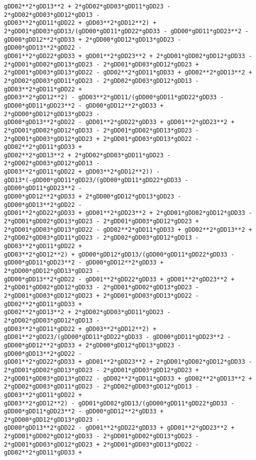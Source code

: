 \documentclass[landscape,letterpaper,10pt,english]{article}
\begin{document}
\begin{Verbatim}[commandchars=\\\{\}]
gDD02**2*gDD13**2 + 2*gDD02*gDD03*gDD11*gDD23 - 2*gDD02*gDD03*gDD12*gDD13 -
gDD03**2*gDD11*gDD22 + gDD03**2*gDD12**2) +
2*gDD01*gDD03*gDD13/(gDD00*gDD11*gDD22*gDD33 - gDD00*gDD11*gDD23**2 -
gDD00*gDD12**2*gDD33 + 2*gDD00*gDD12*gDD13*gDD23 - gDD00*gDD13**2*gDD22 -
gDD01**2*gDD22*gDD33 + gDD01**2*gDD23**2 + 2*gDD01*gDD02*gDD12*gDD33 -
2*gDD01*gDD02*gDD13*gDD23 - 2*gDD01*gDD03*gDD12*gDD23 +
2*gDD01*gDD03*gDD13*gDD22 - gDD02**2*gDD11*gDD33 + gDD02**2*gDD13**2 +
2*gDD02*gDD03*gDD11*gDD23 - 2*gDD02*gDD03*gDD12*gDD13 - gDD03**2*gDD11*gDD22 +
gDD03**2*gDD12**2) - gDD03**2*gDD11/(gDD00*gDD11*gDD22*gDD33 -
gDD00*gDD11*gDD23**2 - gDD00*gDD12**2*gDD33 + 2*gDD00*gDD12*gDD13*gDD23 -
gDD00*gDD13**2*gDD22 - gDD01**2*gDD22*gDD33 + gDD01**2*gDD23**2 +
2*gDD01*gDD02*gDD12*gDD33 - 2*gDD01*gDD02*gDD13*gDD23 -
2*gDD01*gDD03*gDD12*gDD23 + 2*gDD01*gDD03*gDD13*gDD22 - gDD02**2*gDD11*gDD33 +
gDD02**2*gDD13**2 + 2*gDD02*gDD03*gDD11*gDD23 - 2*gDD02*gDD03*gDD12*gDD13 -
gDD03**2*gDD11*gDD22 + gDD03**2*gDD12**2)) -
gDD13*(-gDD00*gDD11*gDD23/(gDD00*gDD11*gDD22*gDD33 - gDD00*gDD11*gDD23**2 -
gDD00*gDD12**2*gDD33 + 2*gDD00*gDD12*gDD13*gDD23 - gDD00*gDD13**2*gDD22 -
gDD01**2*gDD22*gDD33 + gDD01**2*gDD23**2 + 2*gDD01*gDD02*gDD12*gDD33 -
2*gDD01*gDD02*gDD13*gDD23 - 2*gDD01*gDD03*gDD12*gDD23 +
2*gDD01*gDD03*gDD13*gDD22 - gDD02**2*gDD11*gDD33 + gDD02**2*gDD13**2 +
2*gDD02*gDD03*gDD11*gDD23 - 2*gDD02*gDD03*gDD12*gDD13 - gDD03**2*gDD11*gDD22 +
gDD03**2*gDD12**2) + gDD00*gDD12*gDD13/(gDD00*gDD11*gDD22*gDD33 -
gDD00*gDD11*gDD23**2 - gDD00*gDD12**2*gDD33 + 2*gDD00*gDD12*gDD13*gDD23 -
gDD00*gDD13**2*gDD22 - gDD01**2*gDD22*gDD33 + gDD01**2*gDD23**2 +
2*gDD01*gDD02*gDD12*gDD33 - 2*gDD01*gDD02*gDD13*gDD23 -
2*gDD01*gDD03*gDD12*gDD23 + 2*gDD01*gDD03*gDD13*gDD22 - gDD02**2*gDD11*gDD33 +
gDD02**2*gDD13**2 + 2*gDD02*gDD03*gDD11*gDD23 - 2*gDD02*gDD03*gDD12*gDD13 -
gDD03**2*gDD11*gDD22 + gDD03**2*gDD12**2) +
gDD01**2*gDD23/(gDD00*gDD11*gDD22*gDD33 - gDD00*gDD11*gDD23**2 -
gDD00*gDD12**2*gDD33 + 2*gDD00*gDD12*gDD13*gDD23 - gDD00*gDD13**2*gDD22 -
gDD01**2*gDD22*gDD33 + gDD01**2*gDD23**2 + 2*gDD01*gDD02*gDD12*gDD33 -
2*gDD01*gDD02*gDD13*gDD23 - 2*gDD01*gDD03*gDD12*gDD23 +
2*gDD01*gDD03*gDD13*gDD22 - gDD02**2*gDD11*gDD33 + gDD02**2*gDD13**2 +
2*gDD02*gDD03*gDD11*gDD23 - 2*gDD02*gDD03*gDD12*gDD13 - gDD03**2*gDD11*gDD22 +
gDD03**2*gDD12**2) - gDD01*gDD02*gDD13/(gDD00*gDD11*gDD22*gDD33 -
gDD00*gDD11*gDD23**2 - gDD00*gDD12**2*gDD33 + 2*gDD00*gDD12*gDD13*gDD23 -
gDD00*gDD13**2*gDD22 - gDD01**2*gDD22*gDD33 + gDD01**2*gDD23**2 +
2*gDD01*gDD02*gDD12*gDD33 - 2*gDD01*gDD02*gDD13*gDD23 -
2*gDD01*gDD03*gDD12*gDD23 + 2*gDD01*gDD03*gDD13*gDD22 - gDD02**2*gDD11*gDD33 +

\end{Verbatim}
\end{document}

